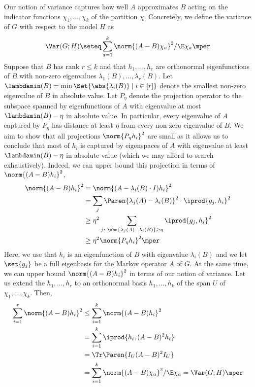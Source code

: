 Our notion of variance captures how well \(A\) approximates \(B\) acting on the indicator functions \(\chi_{1},\ldots,\chi_{k}\) of the partition \(\chi\).
Concretely, we define the variance of \(G\) with respect to the model \(H\) as
\begin{equation}
  \Var(G;H)\seteq \sum_{a=1}^{k} \norm{(A-B)\chi_{a}}^{2}/\E \chi_{a}
  \mper
\end{equation}
Suppose that \(B\) has rank \(r\le k\) and that \(h_{1},\ldots,h_{r}\) are orthonormal eigenfunctions of \(B\) with non-zero eigenvalues \(\lambda_{1}(B),\ldots,\lambda_{r}(B)\).
Let \(\lambdamin(B)=\min\Set{\abs{\lambda_{i}(B)} \mid i\in [r]}\) denote the smallest non-zero eigenvalue of \(B\) in absolute value.
Let \(P_{\eta}\) denote the projection operator to the subspace spanned by eigenfunctions of \(A\) with eigenvalue at most \(\lambdamin(B)-\eta\) in absolute value.
In particular, every eigenvalue of \(A\) captured by \(P_{\eta}\) has distance at least \(\eta\) from every non-zero eigenvalue of \(B\).
We aim to show that all projections \(\norm{P_{\eta} h_{i}}^{2}\) are small as it allows us to conclude that most of \(h_{i}\) is captured by eigenspaces of \(A\) with eigenvalue at least \(\lambdamin(B)-\eta\) in absolute value (which we may afford to search exhaustively).
Indeed, we can upper bound this projection in terms of \(\norm{(A-B)h_{i}}^{2}\),
\begin{align}
  \norm{(A-B)h_{i}}^{2}
  &= \norm{(A-\lambda_{i}(B)\cdot I)h_{i}}^{2}\\
  &= \sum_{j} \Paren{\lambda_{j}(A)-\lambda_{i}(B)}^{2} \cdot \iprod{g_{j},h_{i}}^{2}\\
  &\ge \eta^{2}\sum_{j\colon \abs{\lambda_{j}(A)-\lambda_{i}(B)}\ge \eta} \iprod{g_{j},h_{i}}^{2}\\
  &\ge \eta^{2} \norm{P_{\eta} h_{i}}^{2}
  \mper
\end{align}
Here, we use that \(h_{i}\) is an eigenfunction of \(B\) with eigenvalue \(\lambda_{i}(B)\) and we let \(\set{g_{j}}\) be a full eigenbasis for the Markov operator \(A\) of \(G\).
At the same time, we can upper bound \(\norm{(A-B)h_{i}}^{2}\) in terms of our notion of variance.
Let us extend the \(h_{1},\ldots,h_{r}\) to an orthonormal basis \(h_{1},\ldots,h_{k}\) of the span \(U\) of \(\chi_{1},\ldots,\chi_{k}\).
Then,
\begin{align}
  \sum_{i=1}^{r}\norm{(A-B)h_{i}}^{2}
  & \le   \sum_{i=1}^{k}\norm{(A-B)h_{i}}^{2} \\
  & =  \sum_{i=1}^{k}\iprod{h_{i},(A-B)^{2}h_{i}} \\
  & = \Tr \Paren{I_{U} (A-B)^{2} I_{U}}\\
  &  =   \sum_{i=1}^{k}\norm{(A-B)\chi_{a}}^{2}/\E \chi_{a} = \Var(G;H)
    \mper
\end{align}
